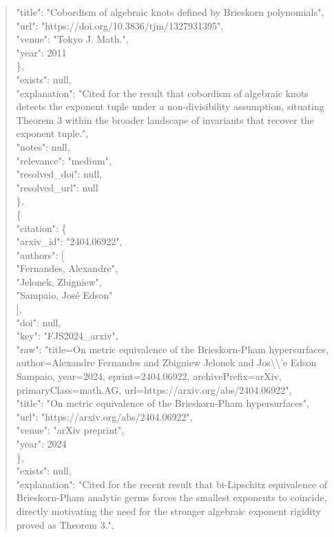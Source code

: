 \documentclass[11pt]{article}
\begin{document}
\begin{quote}
        "title": "Cobordism of algebraic knots defined by Brieskorn polynomials",\\
        "url": "https://doi.org/10.3836/tjm/1327931395",\\
        "venue": "Tokyo J. Math.",\\
        "year": 2011\\
      \},\\
      "exists": null,\\
      "explanation": "Cited for the result that cobordism of algebraic knots detects the exponent tuple under a non-divisibility assumption, situating Theorem 3 within the broader landscape of invariants that recover the exponent tuple.",\\
      "notes": null,\\
      "relevance": "medium",\\
      "resolved\_doi": null,\\
      "resolved\_url": null\\
    \},\\
    \{\\
      "citation": \{\\
        "arxiv\_id": "2404.06922",\\
        "authors": [\\
          "Fernandes, Alexandre",\\
          "Jelonek, Zbigniew",\\
          "Sampaio, José Edson"\\
        ],\\
        "doi": null,\\
        "key": "FJS2024\_arxiv",\\
        "raw": "title=On metric equivalence of the Brieskorn-Pham hypersurfaces, author=Alexandre Fernandes and Zbigniew Jelonek and Jos\textbackslash{}\textbackslash{}'e Edson Sampaio, year=2024, eprint=2404.06922, archivePrefix=arXiv, primaryClass=math.AG, url=https://arxiv.org/abs/2404.06922",\\
        "title": "On metric equivalence of the Brieskorn-Pham hypersurfaces",\\
        "url": "https://arxiv.org/abs/2404.06922",\\
        "venue": "arXiv preprint",\\
        "year": 2024\\
      \},\\
      "exists": null,\\
      "explanation": "Cited for the recent result that bi-Lipschitz equivalence of Brieskorn-Pham analytic germs forces the smallest exponents to coincide, directly motivating the need for the stronger algebraic exponent rigidity proved as Theorem 3.",\\

\end{quote}
\end{document}
